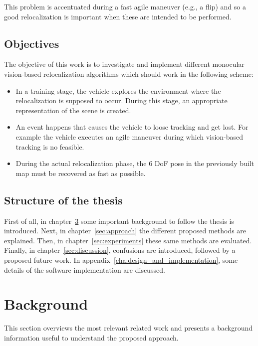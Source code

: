 This problem is accentuated during a fast  agile maneuver (e.g., a flip) and so a good relocalization is important when these are intended to be performed. \\

\section{Objectives}
\label{sub:objectives}

The objective of this work is to investigate and implement different monocular vision-based relocalization algorithms which should work in the following scheme:

\begin{itemize}
  \item In a training stage, the vehicle explores the environment where the relocalization is supposed to occur. During this stage, an appropriate representation of the scene is created. 
  \item An event happens that causes the vehicle to loose tracking and get lost. For example the vehicle executes an agile maneuver during which vision-based tracking is no feasible.
  \item During the actual relocalization phase, the 6 DoF pose in  the previously built map must be recovered as fast as possible.
\end{itemize}

\section{Structure of the thesis}
\label{sec:structure_of_the_thesis}

First of all, in chapter~\ref{cha:background} some important background to follow the thesis is introduced. Next, in chapter~\ref{sec:approach} the different proposed methods are explained. Then, in chapter~\ref{sec:experiments} these same methods are evaluated. Finally, in chapter~\ref{sec:discussion}, confusions are introduced, followed by a proposed future work. In appendix~\ref{cha:design_and_implementation}, some details of the software implementation are discussed.\\


\chapter{Background}
\label{cha:background}

This section overviews the most relevant related work and presents a background information useful to understand the proposed approach.\\


